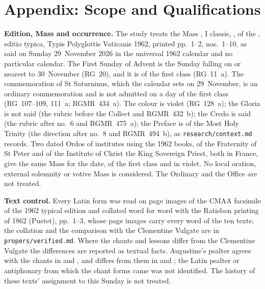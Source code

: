 \section{Appendix: Scope and Qualifications}
\label{sec:scope}

{\small
\textbf{Edition, Mass and occurrence.} The study treats the Mass
, I classis, , of the , editio typica, Typis Polyglottis
Vaticanis 1962, printed pp.~1--2, nos.~1--10, as said on Sunday 29~November
2026 in the universal 1962 calendar and no particular calendar. The First
Sunday of Advent is the Sunday falling on or nearest to 30~November (RG~20),
and it is of the first class (RG~11~a). The commemoration of St Saturninus,
which the calendar sets on 29~November, is an ordinary commemoration and is
not admitted on a day of the first class (RG~107--109, 111~a; RGMR~434~a).
The colour is violet (RG~128~a); the Gloria is not said (the rubric before
the Collect and RGMR~432~b); the Credo is said (the rubric after no.~6 and RGMR~475~a); the
Preface is of the Most Holy Trinity (the direction after no.~8 and
RGMR~494~b), as \texttt{research/context.md} records. Two dated Ordos of
institutes using the 1962 books, of the Fraternity of St Peter and of the
Institute of Christ the King Sovereign Priest, both in France, give the same
Mass for the date, of the first class and in violet. No local oration,
external solemnity or votive Mass is considered. The Ordinary and the Office
are not treated.

\textbf{Text control.} Every Latin form was read on page images of the CMAA
facsimile of the 1962 typical edition and collated word for word with the
Ratisbon printing of 1862 (Pustet), pp.~1--3, whose page images carry every
word of the ten texts; the collation and the comparison with the Clementine
Vulgate are in \texttt{propers/verified.md}. Where the chants and lessons
differ from the Clementine Vulgate the differences are reported as textual
facts. Augustine's psalter agrees with the chants in  and , and differs from them in  and ; the Latin psalter or
antiphonary from which the chant forms came was not identified. The history
of these texts' assignment to this Sunday is not treated.

}
